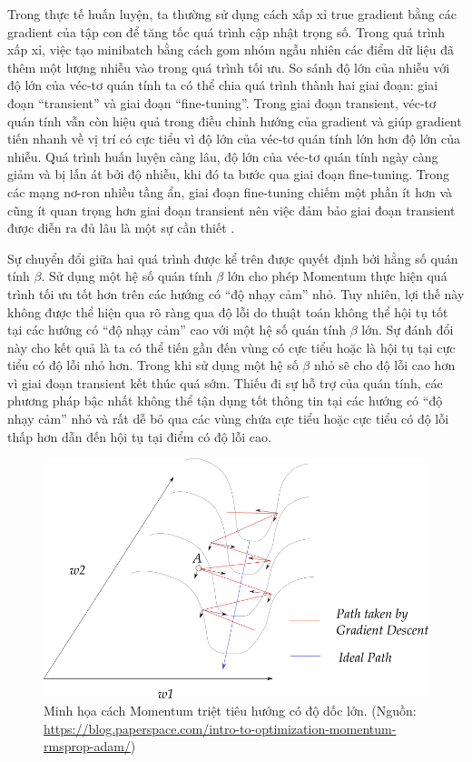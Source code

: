 Trong thực tế huấn luyện, ta thường sử dụng cách xấp xỉ true gradient bằng các gradient của tập con để tăng tốc quá trình cập nhật trọng số. Trong quá trình xấp xỉ, việc tạo minibatch bằng cách gom nhóm ngẫu nhiên các điểm dữ liệu đã thêm một lượng nhiễu vào trong quá trình tối ưu. So sánh độ lớn của nhiễu với độ lớn của véc-tơ quán tính ta có thể chia quá trình thành hai giai đoạn: giai đoạn ``transient'' và giai đoạn ``fine-tuning''. Trong giai đoạn transient, véc-tơ quán tính vẫn còn hiệu quả trong điều chỉnh hướng của gradient và giúp gradient tiến nhanh về vị trí có cực tiểu vì độ lớn của véc-tơ quán tính lớn hơn độ lớn của nhiễu. Quá trình huấn luyện càng lâu, độ lớn của véc-tơ quán tính ngày càng giảm và bị lấn át bởi độ nhiễu, khi đó ta bước qua giai đoạn fine-tuning. Trong các mạng nơ-ron nhiều tầng ẩn, giai đoạn fine-tuning chiếm một phần ít hơn và cũng ít quan trọng hơn giai đoạn transient nên việc đảm bảo giai đoạn transient được diễn ra đủ lâu là một sự cần thiết \cite{sutskever2013onti}.

Sự chuyển đổi giữa hai quá trình được kể trên được quyết định bởi hằng số quán tính $\beta$. Sử dụng một hệ số quán tính $\beta$ lớn cho phép Momentum thực hiện quá trình tối ưu tốt hơn trên các hướng có ``độ nhạy cảm'' nhỏ. Tuy nhiên, lợi thế này không được thể hiện qua rõ ràng qua độ lỗi do thuật toán không thể hội tụ tốt tại các hướng có ``độ nhạy cảm'' cao với một hệ số quán tính $\beta$ lớn. Sự đánh đổi này cho kết quả là ta có thể tiến gần đến vùng có cực tiểu hoặc là hội tụ tại cực tiểu có độ lỗi nhỏ hơn. Trong khi sử dụng một hệ số $\beta$ nhỏ sẽ cho độ lỗi cao hơn vì giai đoạn transient kết thúc quá sớm. Thiếu đi sự hỗ trợ của quán tính, các phương pháp bậc nhất không thể tận dụng tốt thông tin tại các hướng có ``độ nhạy cảm'' nhỏ và rất dễ bỏ qua các vùng chứa cực tiểu hoặc cực tiểu có độ lỗi thấp hơn dẫn đến hội tụ tại điểm có độ lỗi cao.

\begin{figure}[htp]
	\centering
	\includegraphics[width=140 mm]{images/valley-momentum.png}
	\caption{Minh họa cách Momentum triệt tiêu hướng có độ dốc lớn. (Nguồn: \url{https://blog.paperspace.com/intro-to-optimization-momentum-rmsprop-adam/})}
	\label{fig:valley-momentum}
\end{figure}

